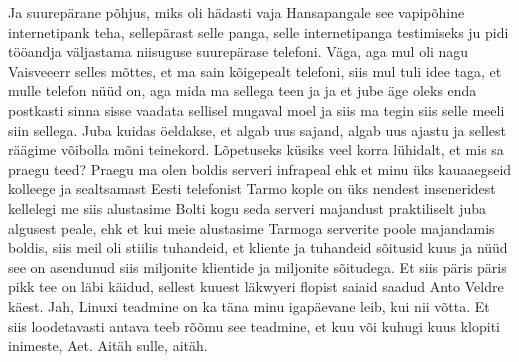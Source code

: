 Ja suurepärane põhjus, miks oli hädasti vaja Hansapangale see vapipõhine internetipank teha, sellepärast selle panga, selle internetipanga testimiseks ju pidi tööandja väljastama niisuguse suurepärase telefoni.
Väga, aga mul oli nagu Vaisveeerr selles mõttes, et ma sain kõigepealt telefoni, siis mul tuli idee taga, et mulle telefon nüüd on, aga mida ma sellega teen ja ja et jube äge oleks enda postkasti sinna sisse vaadata sellisel mugaval moel ja siis ma tegin siis selle meeli siin sellega.
Juba kuidas öeldakse, et algab uus sajand, algab uus ajastu ja sellest räägime võibolla mõni teinekord. Lõpetuseks küsiks veel korra lühidalt, et mis sa praegu teed?
Praegu ma olen boldis serveri infrapeal ehk et minu üks kauaaegseid kolleege ja sealtsamast Eesti telefonist Tarmo kople on üks nendest inseneridest kellelegi me siis alustasime Bolti kogu seda serveri majandust praktiliselt juba algusest peale, ehk et kui meie alustasime Tarmoga serverite poole majandamis boldis, siis meil oli stiilis tuhandeid, et kliente ja tuhandeid sõitusid kuus ja nüüd see on asendunud siis miljonite klientide ja miljonite sõitudega.
Et siis päris päris pikk tee on läbi käidud, sellest kuuest läkwyeri flopist saiaid saadud Anto Veldre käest.
Jah, Linuxi teadmine on ka täna minu igapäevane leib, kui nii võtta.
Et siis loodetavasti antava teeb rõõmu see teadmine, et kuu või kuhugi kuus klopiti inimeste, Aet. Aitäh sulle, aitäh.
